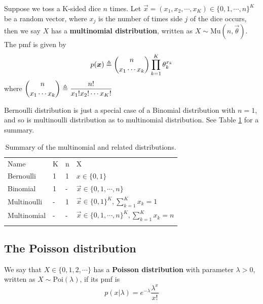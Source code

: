 \documentclass[graybox, envcountchap, twocolumn]{styles/svmult}
\begin{document}
\begin{definition}
Suppose we toss a K-sided dice $n$ times. Let $\vec{x} =(x_1,x_2,\cdots,x_K) \in \{0,1,\cdots,n\}^K$ be a random vector, where $x_j$ is the number of times side $j$ of the dice occurs, then we say $X$ has a \textbf{multinomial distribution}, written as $X \sim \text{Mu}(n, \vec{\theta})$. The pmf is given by 
\begin{equation}\label{eqn:multinomial-pmf}
p(\vec{x}) \triangleq \dbinom{n}{x_1 \cdots x_k} \prod\limits_{k=1}^K\theta_k^{x_k}
\end{equation}
where $\dbinom{n}{x_1 \cdots x_k} \triangleq \dfrac{n!}{x_1!x_2! \cdots x_K!}$
\end{definition}

Bernoulli distribution is just a special case of a Binomial distribution with $n=1$, and so is multinoulli distribution as to multinomial distribution. See Table \ref{tab:multinomial-summary} for a summary.

\begin{table}
\caption{Summary of the multinomial and related distributions.}
\label{tab:multinomial-summary}
\centering
\begin{tabular}{llll}
\hline\noalign{\smallskip}
Name & K & n & X \\
\noalign{\smallskip}\svhline\noalign{\smallskip}
Bernoulli & 1 & 1 & $x \in \{0,1\}$ \\
Binomial & 1 & - & $\vec{x} \in \{0,1,\cdots,n\}$ \\
Multinoulli & - & 1 & $\vec{x} \in \{0,1\}^K, \sum_{k=1}^K x_k=1$ \\
Multinomial & - & - & $\vec{x} \in \{0,1,\cdots,n\}^K, \sum_{k=1}^K x_k=n$ \\
\noalign{\smallskip}\hline
\end{tabular}
\end{table} 


\subsection{The Poisson distribution}
\begin{definition}
We say that $X \in \{0,1,2,\cdots\}$ has a \textbf{Poisson distribution} with parameter $\lambda>0$, written as $X \sim \text{Poi}(\lambda)$, if its pmf is
\begin{equation}
p(x|\lambda)=e^{-\lambda}\dfrac{\lambda^x}{x!}
\end{equation}
\end{definition}
\end{document}
